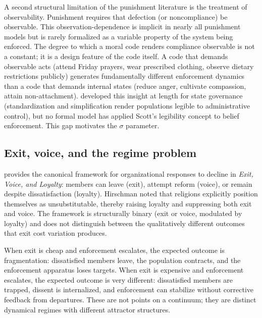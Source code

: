 \documentclass[12pt]{article}
\begin{document}
A second structural limitation of the punishment literature is the treatment of observability. Punishment requires that defection (or noncompliance) be observable. This observation-dependence is implicit in nearly all punishment models but is rarely formalized as a variable property of the system being enforced. The degree to which a moral code renders compliance observable is not a constant; it is a design feature of the code itself. A code that demands observable acts (attend Friday prayers, wear prescribed clothing, observe dietary restrictions publicly) generates fundamentally different enforcement dynamics than a code that demands internal states (reduce anger, cultivate compassion, attain non-attachment). \citet{scott1998} developed this insight at length for state governance (standardization and simplification render populations legible to administrative control), but no formal model has applied Scott's legibility concept to belief enforcement. This gap motivates the $\sigma$ parameter.

\subsection{Exit, voice, and the regime problem}

\citet{hirschman1970} provides the canonical framework for organizational responses to decline in \textit{Exit, Voice, and Loyalty}: members can leave (exit), attempt reform (voice), or remain despite dissatisfaction (loyalty). Hirschman noted that religions explicitly position themselves as unsubstitutable, thereby raising loyalty and suppressing both exit and voice. The framework is structurally binary (exit or voice, modulated by loyalty) and does not distinguish between the qualitatively different outcomes that exit cost variation produces.

When exit is cheap and enforcement escalates, the expected outcome is fragmentation: dissatisfied members leave, the population contracts, and the enforcement apparatus loses targets. When exit is expensive and enforcement escalates, the expected outcome is very different: dissatisfied members are trapped, dissent is internalized, and enforcement can stabilize without corrective feedback from departures. These are not points on a continuum; they are distinct dynamical regimes with different attractor structures.
\end{document}
